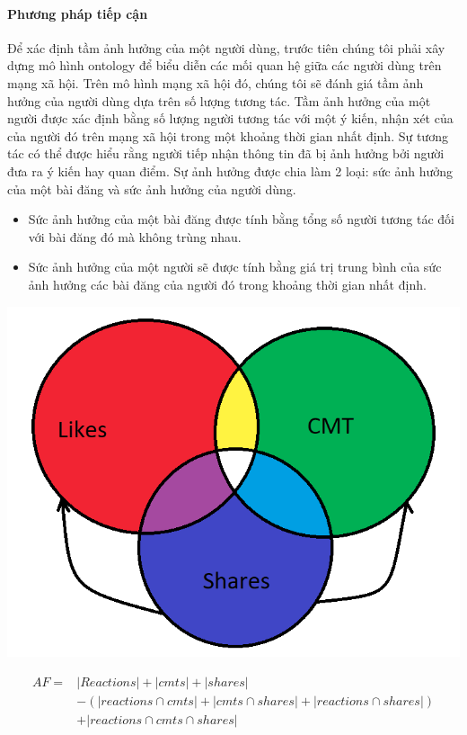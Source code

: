 \documentclass[12pt]{article}
\numberwithin{equation}{section}
\begin{document}
\paragraph{Phương pháp tiếp cận} Để xác định tầm ảnh hưởng của một người dùng, trước tiên chúng tôi phải xây dựng mô hình ontology để biểu diễn các mối quan hệ giữa các người dùng trên mạng xã hội. Trên mô hình mạng xã hội đó, chúng tôi sẽ đánh giá tầm ảnh hưởng của người dùng dựa trên số lượng tương tác. Tầm ảnh hưởng của một người được xác định bằng số lượng người tương tác với một ý kiến, nhận xét của của người đó trên mạng xã hội trong một khoảng thời gian nhất định. Sự tương tác có thể được hiểu rằng người tiếp nhận thông tin đã bị ảnh hưởng bởi người đưa ra ý kiến hay quan điểm. Sự ảnh hưởng được chia làm 2 loại: sức ảnh hưởng của một bài đăng và sức ảnh hưởng của người dùng.

\begin{itemize} 

\item Sức ảnh hưởng của một bài đăng được tính bằng tổng số người tương tác đối với bài đăng đó mà không trùng nhau.

\item Sức ảnh hưởng của một người sẽ được tính bằng giá trị trung bình của sức ảnh hưởng các bài đăng của người đó trong khoảng thời gian nhất định.

\end{itemize}

\begin{center}
\includegraphics[scale=.5]{hinh_af}
\end{center}
$$
\begin{aligned}
AF ={}{}&|Reactions| + |cmts| + |shares|\\
	  	& - (|reactions \cap cmts| + |cmts \cap shares| + |reactions \cap shares|)\\
		& + |reactions \cap cmts \cap shares|
\end{aligned}
$$
\end{document}
